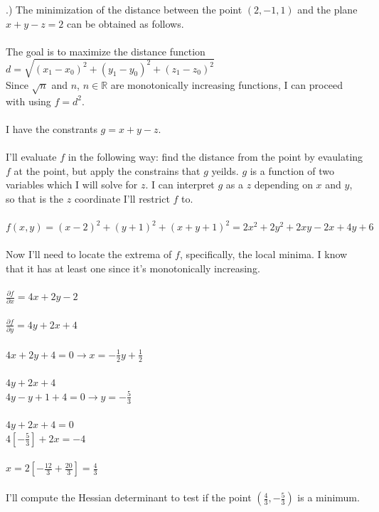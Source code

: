 \documentclass[12pt]{article}
\begin{document}
.) The minimization of the distance between the point $(2, -1, 1)$ and the plane $x+y-z = 2$ can be obtained as follows.\\\\
\noindent The goal is to maximize the distance function $d = \sqrt{(x_{1} - x_{0})^{2} + (y_{1} - y_{0})^{2} + (z_{1} - z_{0})^{2}}$\\
\noindent Since $\sqrt{n}$ and $n$, $n \in \mathbb{R}$ are monotonically increasing functions, I can proceed with using $f = d^{2}$.\\\\
\noindent I have the constrants $g = x+y-z$.\\\\
\noindent I'll evaluate $f$ in the following way: find the distance from the point by evaulating $f$ at the point, but apply the constrains 
that $g$ yeilds. $g$ is a function of two variables which I will solve for $z$. I can interpret $g$ as a $z$ depending on $x$ and $y$, so 
that is the $z$ coordinate I'll restrict $f$ to.\\\\
\noindent $f(x,y) = (x-2)^{2} + (y+1)^{2} + (x + y +1)^{2} = 2x^{2}+2y^{2}+2xy-2x+4y+6$\\\\
\noindent Now I'll need to locate the extrema of $f$, specifically, the local minima. I know that it has at least one since it's monotonically increasing. \\\\
\noindent $\frac{\partial f}{\partial x} = 4x+2y-2$\\\\
\noindent $\frac{\partial f}{\partial y} = 4y+2x + 4$\\\\
\noindent $4x+2y+4 = 0 \rightarrow x = -\frac{1}{2}y+\frac{1}{2}$\\\\
\noindent $4y+2x + 4$\\
\noindent $4y -y + 1 +4 = 0 \rightarrow y = -\frac{5}{3}$\\\\
\noindent $4y+2x+4 = 0$\\
\noindent $4[-\frac{5}{3}] + 2x = -4$\\\\
\noindent $x = 2[-\frac{12}{3} + \frac{20}{3}] = \frac{4}{3}$\\\\
\noindent I'll compute the Hessian determinant to test if the point $(\frac{4}{3}, -\frac{5}{3})$ is a minimum.\\
\end{document}
